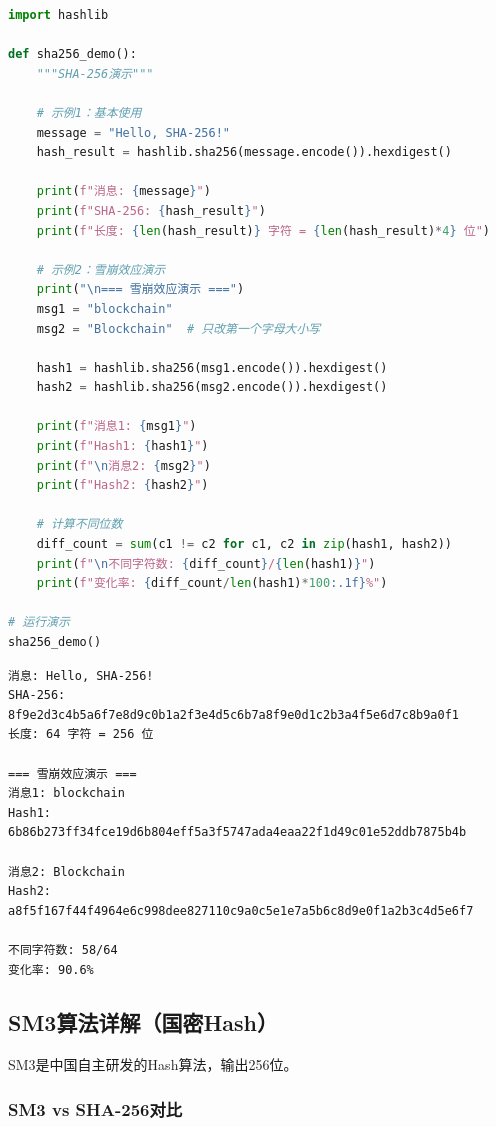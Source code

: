 \documentclass[12pt,a4paper]{article}
\begin{document}
\begin{lstlisting}[language=Python]
import hashlib

def sha256_demo():
    """SHA-256演示"""
    
    # 示例1：基本使用
    message = "Hello, SHA-256!"
    hash_result = hashlib.sha256(message.encode()).hexdigest()
    
    print(f"消息: {message}")
    print(f"SHA-256: {hash_result}")
    print(f"长度: {len(hash_result)} 字符 = {len(hash_result)*4} 位")
    
    # 示例2：雪崩效应演示
    print("\n=== 雪崩效应演示 ===")
    msg1 = "blockchain"
    msg2 = "Blockchain"  # 只改第一个字母大小写
    
    hash1 = hashlib.sha256(msg1.encode()).hexdigest()
    hash2 = hashlib.sha256(msg2.encode()).hexdigest()
    
    print(f"消息1: {msg1}")
    print(f"Hash1: {hash1}")
    print(f"\n消息2: {msg2}")
    print(f"Hash2: {hash2}")
    
    # 计算不同位数
    diff_count = sum(c1 != c2 for c1, c2 in zip(hash1, hash2))
    print(f"\n不同字符数: {diff_count}/{len(hash1)}")
    print(f"变化率: {diff_count/len(hash1)*100:.1f}%")

# 运行演示
sha256_demo()
\end{lstlisting}

\begin{notebox}[运行结果]
\begin{verbatim}
消息: Hello, SHA-256!
SHA-256: 8f9e2d3c4b5a6f7e8d9c0b1a2f3e4d5c6b7a8f9e0d1c2b3a4f5e6d7c8b9a0f1
长度: 64 字符 = 256 位

=== 雪崩效应演示 ===
消息1: blockchain
Hash1: 6b86b273ff34fce19d6b804eff5a3f5747ada4eaa22f1d49c01e52ddb7875b4b

消息2: Blockchain
Hash2: a8f5f167f44f4964e6c998dee827110c9a0c5e1e7a5b6c8d9e0f1a2b3c4d5e6f7

不同字符数: 58/64
变化率: 90.6%
\end{verbatim}
\end{notebox}

\subsection{SM3算法详解（国密Hash）}

SM3是中国自主研发的Hash算法，输出256位。

\subsubsection{SM3 vs SHA-256对比}
\end{document}
